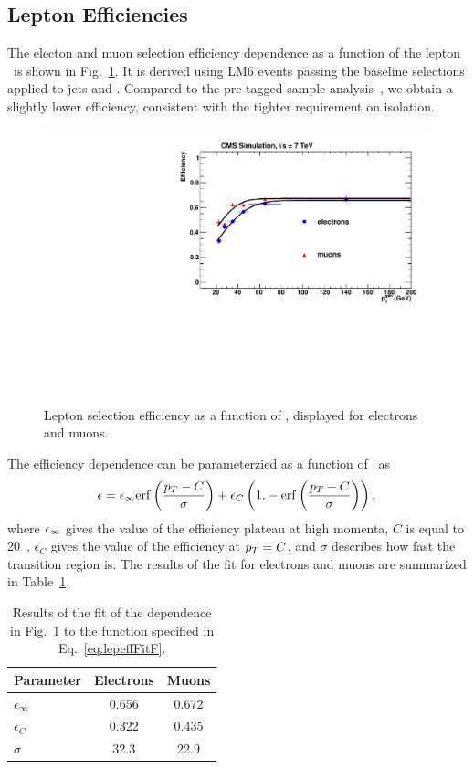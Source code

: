 \subsection{Lepton Efficiencies}
\label{sec:lepeff}
%
The electon and muon selection efficiency dependence as a function of the lepton \pt\
is shown in Fig.~\ref{fig:lepeffLM6}.
It is derived using LM6 events passing the baseline selections applied to jets and \met.
Compared to the pre-tagged sample analysis~\cite{ssnote2011}, we obtain a slightly
lower efficiency, consistent with the tighter requirement on isolation.

\begin{figure}[h]
\begin{center}
\includegraphics[width=0.7\linewidth]{figs/leptonEfficiency_lm6}
\caption{\label{fig:lepeffLM6}
Lepton selection efficiency as a function of \pt,
displayed for electrons and muons.
}
\end{center}
\end{figure}

%
The efficiency dependence can be parameterzied as a function of \pt\ as 
%
\begin{eqnarray}
\epsilon = \epsilon_{\rm \infty} {\rm erf}\left ( \frac{p_T - C}{\sigma} \right)
	+ \epsilon_C \left( 1.- {\rm erf}\left ( \frac{p_T - C}{\sigma} \right) \right),
\label{eq:lepeffFitF}
\end{eqnarray}
where $\epsilon_{\rm \infty}$ gives the value of the efficiency plateau at high momenta,
$C$ is equal to 20~\GeV,
$\epsilon_C$ gives the value of the efficiency at $p_T=C$,
and $\sigma$ describes how fast the transition region is.
The results of the fit for electrons and muons are summarized in Table~\ref{tab:lepeffLM6fit}.
%
\begin{table}[h]
\begin{center}
\caption{\label{tab:lepeffLM6fit} Results of the fit of the dependence in Fig.~\ref{fig:lepeffLM6}
to the function specified in Eq.~\ref{eq:lepeffFitF}.}
\begin{tabular}{l|cc}\hline\hline
Parameter		& Electrons		& Muons			\\ \hline
$\epsilon_{\infty}$	& 0.656	& 0.672	\\
$\epsilon_{C}$		& 0.322	& 0.435	\\
$\sigma$		& 32.3  & 22.9	\\
\hline\hline
\end{tabular}
\end{center}
\end{table}

